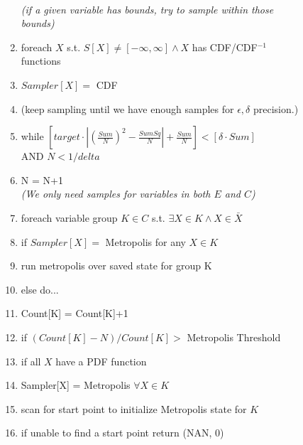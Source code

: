 \begin{figure}
\begin{algorithm}
\begin{enumerate}
\\    \hspace*{0.2in} \textit{(if a given variable has bounds, try to sample within those bounds)}
\item \hspace*{0.2in} foreach $X$ s.t. $S[X] \neq [-\infty, \infty] \wedge X$ has CDF/CDF$^{-1}$ functions
\item \hspace*{0.3in} $Sampler[X] =$ CDF
\item \hspace*{0.1in} (keep sampling until we have enough samples for $\epsilon, \delta$ precision.)
\item \hspace*{0.1in} while $\left[target \cdot \left|(\frac{Sum}{N})^2 - \frac{SumSq}{N}\right| + \frac{Sum}{N}\right] < \left[\delta \cdot Sum\right]$  \\\hspace*{0.4in} AND $N < 1/delta$
\item \hspace*{0.2in} N = N+1
\\    \hspace*{0.2in} \textit{(We only need samples for variables in both $E$ and $C$)}
\item \hspace*{0.2in} foreach variable group $K \in C$ s.t. $\exists X \in K \wedge X \in \bar X$
\item \hspace*{0.3in} if $Sampler[X] =$ Metropolis for any $X \in K$
\item \hspace*{0.4in} run metropolis over saved state for group K
\item \hspace*{0.3in} else do...
\item \hspace*{0.4in} Count[K] = Count[K]+1
\item \hspace*{0.4in} if $(Count[K]-N)/Count[K] >$ Metropolis Threshold
\item \hspace*{0.5in} if all $X$ have a PDF function
\item \hspace*{0.6in} Sampler[X] = Metropolis $\forall X \in K$
\item \hspace*{0.6in} scan for start point to initialize Metropolis state for $K$ 
\item \hspace*{0.6in} if unable to find a start point return (NAN, 0)

\end{enumerate}
\end{algorithm}
\end{figure}
